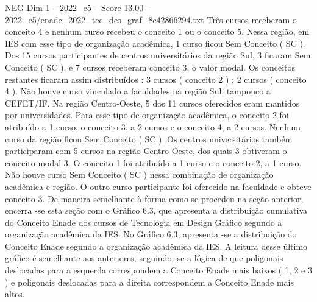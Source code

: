 \begin{textsample}{NEG Dim 1 – 2022\_c5 – Score 13.00 – 2022\_c5/enade\_2022\_tec\_des\_graf\_8c42866294.txt}
Três cursos receberam o conceito 4 e nenhum curso recebeu o conceito 1 ou o conceito 5.
Nessa região, em IES com esse tipo de organização acadêmica, 1 curso ficou Sem Conceito ( SC ).
Dos 15 cursos participantes de centros universitários da região Sul, 3 ficaram Sem Conceito ( SC ), e 7 cursos receberam conceito 3, o valor modal.
Os conceitos restantes ficaram assim distribuídos : 3 cursos ( conceito 2 ) ; 2 cursos ( conceito 4 ).
Não houve curso vinculado a faculdades na região Sul, tampouco a CEFET/IF.
Na região Centro-Oeste, 5 dos 11 cursos oferecidos eram mantidos por universidades.
Para esse tipo de organização acadêmica, o conceito 2 foi atribuído a 1 curso, o conceito 3, a 2 cursos e o conceito 4, a 2 cursos.
Nenhum curso da região ficou Sem Conceito ( SC ).
Os centros universitários também participaram com 5 cursos na região Centro-Oeste, dos quais 3 obtiveram o conceito modal 3.
O conceito 1 foi atribuído a 1 curso e o conceito 2, a 1 curso.
Não houve curso Sem Conceito ( SC ) nessa combinação de organização acadêmica e região.
O outro curso participante foi oferecido na faculdade e obteve conceito 3.
De maneira semelhante à forma como se procedeu na seção anterior, encerra -se esta seção com o Gráfico 6.3, que apresenta a distribuição cumulativa do Conceito Enade dos cursos de Tecnologia em Design Gráfico segundo a organização acadêmica da IES.
No Gráfico 6.3, apresenta -se a distribuição do Conceito Enade segundo a organização acadêmica da IES.
A leitura desse último gráfico é semelhante aos anteriores, seguindo -se a lógica de que poligonais deslocadas para a esquerda correspondem a Conceito Enade mais baixos ( 1, 2 e 3 ) e poligonais deslocadas para a direita correspondem a Conceito Enade mais altos.

\end{textsample}
